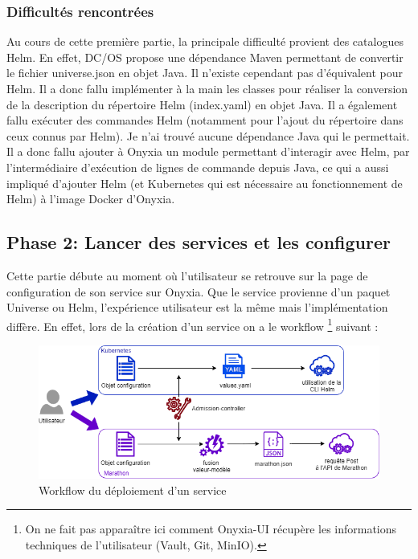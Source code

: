 \documentclass[11pt,fleqn]{book} %
\begin{document}
\subsubsection{Difficultés rencontrées}
Au cours de cette première partie, la principale difficulté provient des catalogues Helm. En effet, DC/OS propose une dépendance Maven permettant de convertir le fichier universe.json en objet Java. Il n'existe cependant pas d'équivalent pour Helm. Il a donc fallu implémenter à la main les classes pour réaliser la conversion de la description du répertoire Helm (index.yaml) en objet Java. Il a également fallu exécuter des commandes Helm (notamment pour l'ajout du répertoire dans ceux connus par Helm). Je n'ai trouvé aucune dépendance Java qui le permettait. Il a donc fallu ajouter à Onyxia un module permettant d'interagir avec Helm, par l'intermédiaire d'exécution de lignes de commande depuis Java, ce qui a aussi impliqué d'ajouter Helm (et Kubernetes qui est nécessaire au fonctionnement de Helm) à l'image Docker d'Onyxia.

\subsection{Phase 2: Lancer des services et les configurer}
Cette partie débute au moment où l'utilisateur se retrouve sur la page de configuration de son service sur Onyxia. Que le service provienne d'un paquet Universe ou Helm, l'expérience utilisateur est la même mais l'implémentation diffère. En effet, lors de la création d'un service on a le workflow \footnote{On ne fait pas apparaître ici comment Onyxia-UI récupère les informations techniques de l'utilisateur (Vault, Git, MinIO).} suivant : 
\begin{figure}[H]
\hspace{-2cm}
\renewcommand{\figurename}{Diagramme}
\includegraphics[scale=0.7]{Pictures/onyxia/publish-service.png}
\captionsetup{margin=1.5cm,format=hang,justification=justified}
\caption{Workflow du déploiement d'un service \newline}
\end{figure}
\end{document}
